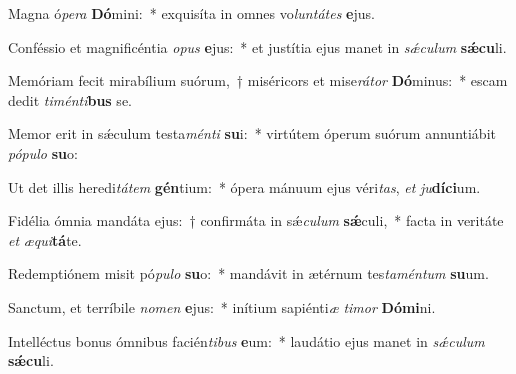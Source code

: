 \item Magna ó\textit{pe}\textit{ra} \textbf{Dó}mini:~* exquisíta in omnes vo\textit{lun}\textit{tá}\textit{tes} \textbf{e}jus.
\item Conféssio et magnificéntia \textit{o}\textit{pus} \textbf{e}jus:~* et justítia ejus manet in \textit{sǽ}\textit{cu}\textit{lum} \textbf{sǽ}\textbf{cu}li.
\item Memóriam fecit mirabílium suórum,~† miséricors et mise\textit{rá}\textit{tor} \textbf{Dó}minus:~* escam dedit \textit{ti}\textit{mén}\textit{ti}\textbf{bus} se.
\item Memor erit in sǽculum testa\textit{mén}\textit{ti} \textbf{su}i:~* virtútem óperum suórum annuntiábit \textit{pó}\textit{pu}\textit{lo} \textbf{su}o:
\item Ut det illis heredi\textit{tá}\textit{tem} \textbf{gén}tium:~* ópera mánuum ejus véri\textit{tas}, \textit{et} \textit{ju}\textbf{dí}\textbf{ci}um.
\item Fidélia ómnia mandáta ejus:~† confirmáta in sǽ\textit{cu}\textit{lum} \textbf{sǽ}culi,~* facta in veritáte \textit{et} \textit{æ}\textit{qui}\textbf{tá}te.
\item Redemptiónem misit pó\textit{pu}\textit{lo} \textbf{su}o:~* mandávit in ætérnum tes\textit{ta}\textit{mén}\textit{tum} \textbf{su}um.
\item Sanctum, et terríbile \textit{no}\textit{men} \textbf{e}jus:~* inítium sapiénti\textit{æ} \textit{ti}\textit{mor} \textbf{Dó}\textbf{mi}ni.
\item Intelléctus bonus ómnibus facién\textit{ti}\textit{bus} \textbf{e}um:~* laudátio ejus manet in \textit{sǽ}\textit{cu}\textit{lum} \textbf{sǽ}\textbf{cu}li.
